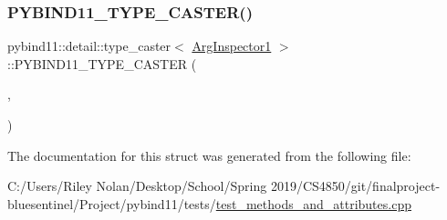 \subsubsection{\texorpdfstring{PYBIND11\_TYPE\_CASTER()}{PYBIND11\_TYPE\_CASTER()}}
{\footnotesize\ttfamily pybind11\+::detail\+::type\+\_\+caster$<$ \mbox{\hyperlink{class_arg_inspector1}{Arg\+Inspector1}} $>$\+::P\+Y\+B\+I\+N\+D11\+\_\+\+T\+Y\+P\+E\+\_\+\+C\+A\+S\+T\+ER (\begin{DoxyParamCaption}\item[{\mbox{\hyperlink{class_arg_inspector1}{Arg\+Inspector1}}}]{,  }\item[{\mbox{\hyperlink{descr_8h_af114703e20c6527e87163eb2798f74b8}{\+\_\+}}(\char`\"{}Arg\+Inspector1\char`\"{})}]{ }\end{DoxyParamCaption})}



The documentation for this struct was generated from the following file\+:\begin{DoxyCompactItemize}
\item 
C\+:/\+Users/\+Riley Nolan/\+Desktop/\+School/\+Spring 2019/\+C\+S4850/git/finalproject-\/bluesentinel/\+Project/pybind11/tests/\mbox{\hyperlink{test__methods__and__attributes_8cpp}{test\+\_\+methods\+\_\+and\+\_\+attributes.\+cpp}}\end{DoxyCompactItemize}
